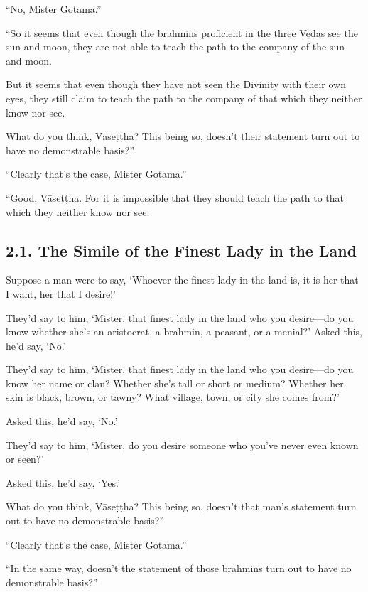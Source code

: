 \documentclass[12pt,openany]{book}%
\begin{document}
“No, Mister Gotama.” 

“So it seems that even though the brahmins proficient in the three Vedas see the sun and moon, they are not able to teach the path to the company of the sun and moon. 

But it seems that even though they have not seen the Divinity with their own eyes, they still claim to teach the path to the company of that which they neither know nor see. 

What do you think, \textsanskrit{Vāseṭṭha}? This being so, doesn’t their statement turn out to have no demonstrable basis?” 

“Clearly that’s the case, Mister Gotama.” 

“Good, \textsanskrit{Vāseṭṭha}. For it is impossible that they should teach the path to that which they neither know nor see. 

\subsection*{2.1. The Simile of the Finest Lady in the Land }

Suppose a man were to say, ‘Whoever the finest lady in the land is, it is her that I want, her that I desire!’ 

They’d say to him, ‘Mister, that finest lady in the land who you desire—do you know whether she’s an aristocrat, a brahmin, a peasant, or a menial?’ Asked this, he’d say, ‘No.’ 

They’d say to him, ‘Mister, that finest lady in the land who you desire—do you know her name or clan? Whether she’s tall or short or medium? Whether her skin is black, brown, or tawny? What village, town, or city she comes from?’ 

Asked this, he’d say, ‘No.’ 

They’d say to him, ‘Mister, do you desire someone who you’ve never even known or seen?’ 

Asked this, he’d say, ‘Yes.’ 

What do you think, \textsanskrit{Vāseṭṭha}? This being so, doesn’t that man’s statement turn out to have no demonstrable basis?” 

“Clearly that’s the case, Mister Gotama.” 

“In the same way, doesn’t the statement of those brahmins turn out to have no demonstrable basis?” 
\end{document}

